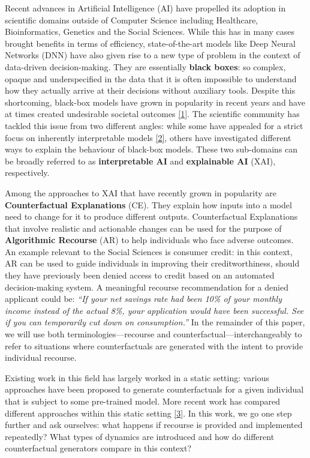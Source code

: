 \documentclass[conference,final,]{IEEEtran}
\theoremstyle{definition}
\theoremstyle{definition}
\theoremstyle{definition}
\theoremstyle{definition}
\theoremstyle{remark}
\begin{document}
Recent advances in Artificial Intelligence (AI) have propelled its adoption in scientific domains outside of Computer Science including Healthcare, Bioinformatics, Genetics and the Social Sciences. While this has in many cases brought benefits in terms of efficiency, state-of-the-art models like Deep Neural Networks (DNN) have also given rise to a new type of problem in the context of data-driven decision-making. They are essentially \textbf{black boxes}: so complex, opaque and underspecified in the data that it is often impossible to understand how they actually arrive at their decisions without auxiliary tools. Despite this shortcoming, black-box models have grown in popularity in recent years and have at times created undesirable societal outcomes \protect\hyperlink{ref-oneil2016weapons}{{[}1{]}}. The scientific community has tackled this issue from two different angles: while some have appealed for a strict focus on inherently interpretable models \protect\hyperlink{ref-rudin2019stop}{{[}2{]}}, others have investigated different ways to explain the behaviour of black-box models. These two sub-domains can be broadly referred to as \textbf{interpretable AI} and \textbf{explainable AI} (XAI), respectively.

Among the approaches to XAI that have recently grown in popularity are \textbf{Counterfactual Explanations} (CE). They explain how inputs into a model need to change for it to produce different outputs. Counterfactual Explanations that involve realistic and actionable changes can be used for the purpose of \textbf{Algorithmic Recourse} (AR) to help individuals who face adverse outcomes. An example relevant to the Social Sciences is consumer credit: in this context, AR can be used to guide individuals in improving their creditworthiness, should they have previously been denied access to credit based on an automated decision-making system. A meaningful recourse recommendation for a denied applicant could be: \emph{``If your net savings rate had been 10\% of your monthly income instead of the actual 8\%, your application would have been successful. See if you can temporarily cut down on consumption.''} In the remainder of this paper, we will use both terminologies---recourse and counterfactual---interchangeably to refer to situations where counterfactuals are generated with the intent to provide individual recourse.

Existing work in this field has largely worked in a static setting: various approaches have been proposed to generate counterfactuals for a given individual that is subject to some pre-trained model. More recent work has compared different approaches within this static setting \protect\hyperlink{ref-pawelczyk2021carla}{{[}3{]}}. In this work, we go one step further and ask ourselves: what happens if recourse is provided and implemented repeatedly? What types of dynamics are introduced and how do different counterfactual generators compare in this context?
\end{document}
